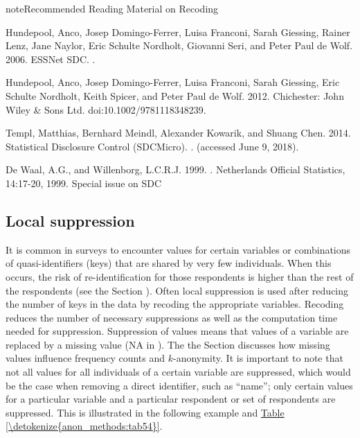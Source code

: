 \documentclass[letterpaper,10pt,english]{sphinxmanual}
\begin{document}
\begin{sphinxadmonition}{note}{Recommended Reading Material on Recoding}

Hundepool, Anco, Josep Domingo-Ferrer, Luisa Franconi, Sarah Giessing,
Rainer Lenz, Jane Naylor, Eric Schulte Nordholt, Giovanni Seri, and
Peter Paul de Wolf. 2006. 
ESSNet SDC. .

Hundepool, Anco, Josep Domingo-Ferrer, Luisa Franconi, Sarah Giessing,
Eric Schulte Nordholt, Keith Spicer, and Peter Paul de Wolf. 2012.
 Chichester: John Wiley \& Sons Ltd.
doi:10.1002/9781118348239.

Templ, Matthias, Bernhard Meindl, Alexander Kowarik, and Shuang Chen.
2014. Statistical Disclosure Control (SDCMicro).
. (accessed
June 9, 2018).

De Waal, A.G., and Willenborg, L.C.R.J. 1999. . Netherlands Official Statistics,
14:17-20, 1999. Special issue on SDC
\end{sphinxadmonition}


\subsection{Local suppression}
\label{\detokenize{anon_methods:local-suppression}}
It is common in surveys to encounter values for certain variables or
combinations of quasi-identifiers (keys) that are shared by very few
individuals. When this occurs, the risk of re-identification for those
respondents is higher than the rest of the respondents (see
the Section ).
Often local suppression is used
after reducing the number of keys in the data by recoding the
appropriate variables. Recoding reduces the number of necessary
suppressions as well as the computation time needed for suppression.
Suppression of values means that values of a variable are replaced by a
missing value (NA in ). The the Section 
discusses how missing values influence frequency counts and
\(k\)-anonymity. It is important to note that not all values for all
individuals of a certain variable are suppressed, which would be the
case when removing a direct identifier, such as “name”; only certain
values for a particular variable and a particular respondent or set of
respondents are suppressed. This is illustrated in the following example
and \hyperref[\detokenize{anon_methods:tab54}]{Table \ref{\detokenize{anon_methods:tab54}}}.
\end{document}
